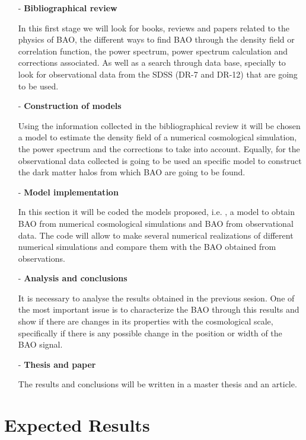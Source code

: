 \documentclass[a4,useAMS,usegraphicx,12pt]{article}
\begin{document}
\begin{itemize}

\item[-] \textbf{ Bibliographical review }
	
In this first stage we will look for books, reviews and papers related to the physics of 
BAO, the different ways to find BAO through the density field or correlation function, the 
power spectrum, power spectrum calculation and corrections associated. As well as a search 
through data base, specially to look for observational data  from the SDSS (DR-7 and DR-12) 
that are going to be used.

\item[-] \textbf{ Construction of models } 

Using the information collected in the bibliographical review
it will be chosen a model to estimate the density field of a numerical cosmological simulation,
the power spectrum and the corrections to take into account. Equally, for the observational
data collected is going to be used an specific model to construct the dark matter halos
from which  BAO are going to be found.

\item[-] \textbf{ Model implementation } 

In this section it will be coded the models proposed, i.e. ,
a model to obtain BAO from numerical cosmological simulations and BAO from observational data.  
The code will allow to make several numerical realizations of different numerical
simulations and compare them with the BAO obtained from observations. 

\item[-] \textbf{ Analysis and conclusions } 

It is necessary to analyse the results obtained in the 
previous sesion. One of the most important 
issue is to characterize the BAO through this results and show if there are changes in its properties  
with the cosmological scale, specifically if there is any possible change in the position or 
width of the BAO signal.  

\item[-] \textbf{ Thesis and paper } 

The results and conclusions will be written in  a master thesis and 
an article. 

\end{itemize}

\section{Expected Results}
\end{document}
